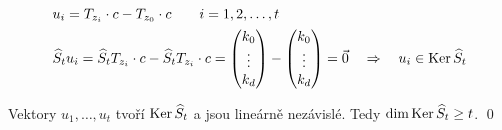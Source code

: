 \begin{align*}
	&u_i = T_{z_i}\cdot c - T_{z_0}\cdot c\qquad i = 1, 2, \dots, t \\
	&\widehat S_t u_i = \widehat S_t T_{z_i}\cdot c - \widehat S_t T_{z_i}\cdot c = \left(\begin{matrix}k_0 \\ \vdots \\ k_d\end{matrix}\right) - \left(\begin{matrix}k_0 \\ \vdots \\ k_d\end{matrix}\right) = \vec 0 \quad\Rightarrow\quad u_i\in\operatorname{Ker} \widehat S_t\\
\end{align*}

Vektory $u_1,\dots, u_t$ tvoří $\operatorname{Ker} \widehat S_t$ a jsou lineárně nezávislé. Tedy $\dim\operatorname{Ker}\widehat S_t \ge t$.
\qed


